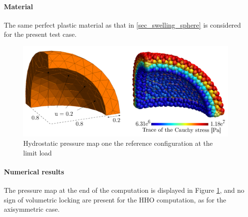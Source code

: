 \paragraph{Material}

The same perfect plastic material as that in \ref{sec_swelling_sphere} is considered for the present test case.

\begin{figure}[H]
    \centering
    \includegraphics[width=14.cm]{../chapter_002_hho_mechanics/drawings/sphere_appendix.png}
    \caption{Hydrostatic pressure map one the reference configuration at the limit load}
    \label{fig_cube}
\end{figure}

\paragraph{Numerical results}

The pressure map at the end of the computation is displayed in Figure \ref{fig_cube}, and no sign of volumetric locking are present for the HHO computation, as for the axisymmetric case.
